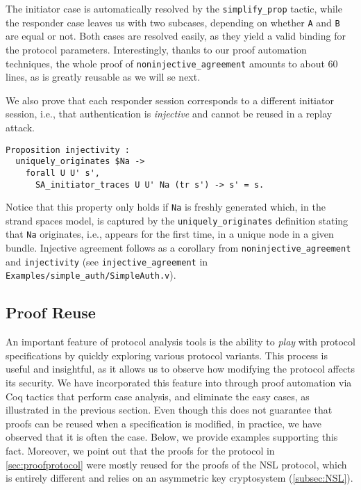 The initiator case is automatically resolved by the \lstinline{simplify_prop} tactic, while the responder case leaves us with two subcases, depending on whether \lstinline{A} and \lstinline{B} are equal or not.
Both cases are resolved easily, as they yield a valid binding for the protocol parameters.
Interestingly, thanks to our proof automation techniques, the whole proof of \lstinline|noninjective_agreement| amounts to about 60 lines, as is greatly reusable as we will se next.

We also prove that each responder session corresponds to a different initiator session, i.e., that authentication is \emph{injective} and cannot be reused in a replay attack.
\begin{lstlisting}
Proposition injectivity :
  uniquely_originates $Na ->
    forall U U' s',
      SA_initiator_traces U U' Na (tr s') -> s' = s.
\end{lstlisting}
Notice that this property only holds if \lstinline{Na} is freshly generated which, in the strand spaces model, is captured by the \lstinline{uniquely_originates} definition stating that \lstinline{Na} originates, i.e., appears for the first time, in a unique node in a given bundle.
Injective agreement follows as a corollary from \lstinline{noninjective_agreement} and \lstinline{injectivity} (see \lstinline{injective_agreement} in \lstinline{Examples/simple_auth/SimpleAuth.v}).
\subsection{Proof Reuse}\label{sec:reusing}
An important feature of protocol analysis tools is the ability to \emph{play} with protocol specifications by quickly exploring various protocol variants.
This process is useful and insightful, as it allows us to observe how modifying the protocol affects its security.
We have incorporated this feature into \easystrands{} through proof automation via Coq tactics that perform case analysis, and eliminate the easy cases, as illustrated in the previous section.
Even though this does not guarantee that proofs can be reused when a specification is modified, in practice, we have observed that it is often the case.
Below, we provide examples supporting this fact.
Moreover, we point out that the proofs for the protocol in \cref{sec:proofprotocol} were mostly reused for the proofs of the NSL protocol, which is entirely different and relies on an asymmetric key cryptosystem (\cref{subsec:NSL}).

